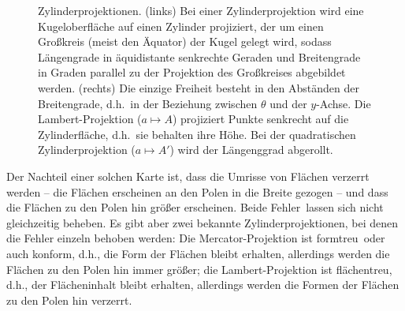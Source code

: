 \begin{figure}[htb]
\hspace{1cm}
%
\caption{\label{fig_Zylinderprojektion}%
Zylinderprojektionen. (links) Bei einer Zylinderprojektion wird eine Kugeloberfl\"ache auf einen Zylinder
projiziert, der um einen Gro\ss kreis (meist den \"Aquator) der Kugel gelegt wird, sodass L\"angengrade
in \"aquidistante senkrechte Geraden und Breitengrade in Graden parallel zu der Projektion des
Gro\ss kreises abgebildet werden. (rechts) Die einzige Freiheit besteht in den Abst\"anden der Breitengrade,
d.h.\ in der Beziehung zwischen $\theta$ und  der $y$-Achse. Die Lambert-Projektion ($a\mapsto A$)
projiziert Punkte senkrecht auf die Zylinderfl\"ache, d.h.\ sie behalten ihre H\"ohe. Bei der quadratischen
Zylinderprojektion ($a\mapsto A'$) wird der L\"angenggrad \glqq abgerollt\grqq.} 
\end{figure}


Der Nachteil einer solchen Karte ist, dass die Umrisse von Fl\"achen verzerrt werden -- die Fl\"achen erscheinen
an den Polen in die Breite gezogen -- und dass die Fl\"achen zu den Polen hin gr\"o\ss er erscheinen.
Beide \glqq Fehler\grqq\ lassen sich nicht gleichzeitig beheben. Es gibt aber zwei bekannte Zylinderprojektionen,
bei denen die Fehler einzeln behoben werden: Die Mercator-Projektion ist 
\glqq formtreu\grqq\ oder auch
konform, d.h., die Form der Fl\"achen bleibt erhalten, allerdings werden die Fl\"achen zu den Polen hin immer
gr\"o\ss er; die Lambert-Projektion ist \glqq fl\"achentreu\grqq, d.h., der Fl\"acheninhalt bleibt erhalten, 
allerdings werden die Formen der Fl\"achen zu den Polen hin verzerrt.

